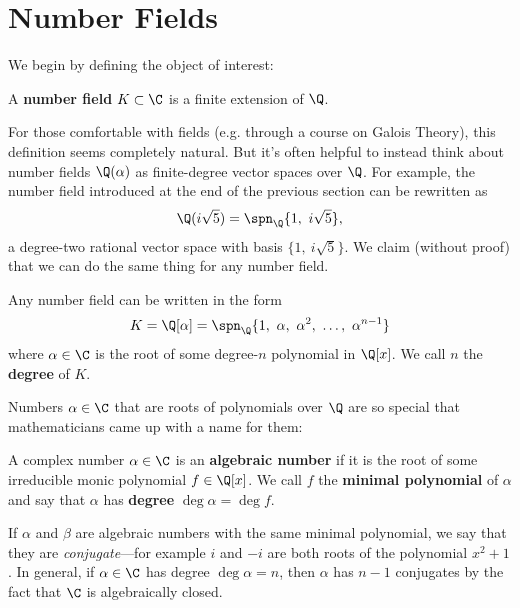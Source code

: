 \section{Number Fields}

We begin by defining the object of interest:

\begin{definition}
    A \textbf{number field} $K \subset \C$ is a finite extension of $\Q$.
\end{definition}

For those comfortable with fields (e.g. through a course on Galois Theory), this definition seems completely natural. But it's often helpful to instead think about number fields $\Q(\alpha)$ as finite-degree vector spaces over $\Q$. For example, the number field introduced at the end of the previous section can be rewritten as
\begin{equation}
    \Q(i \sqrt 5) = \spn_\Q \{ 1, \ i \sqrt 5 \},
\end{equation}
a degree-two rational vector space with basis $\{ 1, \ i \sqrt 5 \}$.
We claim (without proof) that we can do the same thing for any number field.

\begin{theorem}
    Any number field can be written in the form
    \begin{equation*}
        K
        = \Q[\alpha]
        = \spn_\Q \{ 1, \ \alpha, \ \alpha^2, \ \ldots, \ \alpha^{n-1} \}
    \end{equation*}
    where $\alpha \in \C$ is the root of some degree-$n$ polynomial in $\Q[x]$. We call $n$ the \textbf{degree} of $K$.
\end{theorem}

Numbers $\alpha \in \C$ that are roots of polynomials over $\Q$ are so special that mathematicians came up with a name for them:

\begin{definition}
    A complex number $\alpha \in \C$ is an \textbf{algebraic number} if it is the root of some irreducible monic polynomial $f \in \Q[x]$. We call $f$ the \textbf{minimal polynomial} of $\alpha$ and say that $\alpha$ has \textbf{degree} $\deg \alpha = \deg f$.
\end{definition}

If $\alpha$ and $\beta$ are algebraic numbers with the same minimal polynomial, we say that they are \emph{conjugate}---for example $i$ and $-i$ are both roots of the polynomial $x^2 + 1$. In general, if $\alpha \in \C$ has degree $\deg \alpha = n$, then $\alpha$ has $n - 1$ conjugates by the fact that $\C$ is algebraically closed.

